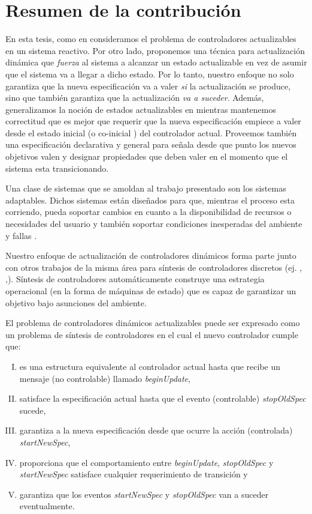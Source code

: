 \section{Resumen de la contribución}

En esta tesis, como en \cite{6224401,PanzicaLaManna:2013:FCC:2487336.2487349} consideramos el problema de controladores
actualizables en un sistema reactivo. Por otro lado, proponemos una técnica para actualización dinámica que
\emph{fuerza} al sistema a alcanzar un estado actualizable en vez de asumir que el sistema va a llegar a dicho estado.
Por lo tanto, nuestro enfoque no solo garantiza que la nueva especificación va a valer \emph{si} la actualización se
produce, sino que también garantiza que la actualización \emph{va a suceder}. Además, generalizamos la noción de estados
actualizables en \cite{6224401,PanzicaLaManna:2013:FCC:2487336.2487349} mientras mantenemos correctitud que es mejor que
requerir que la nueva especificación empiece a valer desde el estado inicial (o co-inicial 
\cite{PanzicaLaManna:2013:FCC:2487336.2487349}) del controlador actual. Proveemos también una especificación declarativa
y general para señala desde que punto los nuevos objetivos valen y designar propiedades que deben valer en el momento
que el sistema esta transicionando. 

Una clase de sistemas que se amoldan al trabajo presentado son los sistemas adaptables. Dichos sistemas están diseñados
para que, mientras el proceso esta corriendo, pueda soportar cambios en cuanto a la disponibilidad de recursos o
necesidades del usuario y también soportar condiciones inesperadas del ambiente y fallas \cite{SEAMS}. 

Nuestro enfoque de actualización de controladores dinámicos forma parte junto con otros trabajos de la misma área para
síntesis de controladores discretos (ej. \cite{21072}, \cite{Piterman},\cite{D'ippolito:2013:SNE:2430536.2430543}).
Síntesis de controladores automáticamente construye una estrategia operacional (en la forma de máquinas de estado) que
es capaz de garantizar un objetivo bajo asunciones del ambiente.

El problema de controladores dinámicos actualizables puede ser expresado como un problema de síntesis de controladores
en el cual el nuevo controlador cumple que:

\begin{enumerate}[I)]
\itemsep-4mm
\item es una estructura equivalente al controlador actual hasta que recibe un mensaje (no controlable) llamado
\emph{beginUpdate},
\item  satisface la especificación actual hasta que el evento (controlable) \emph{stopOldSpec} sucede,
\item garantiza a la nueva especificación desde que ocurre la acción (controlada) \emph{startNewSpec},
\item proporciona que el comportamiento entre \emph{beginUpdate}, \emph{stopOldSpec} y \emph{startNewSpec} satisface
cualquier requerimiento de transición y
\item garantiza que los eventos \emph{startNewSpec} y \emph{stopOldSpec} van a suceder eventualmente.
\end{enumerate}


